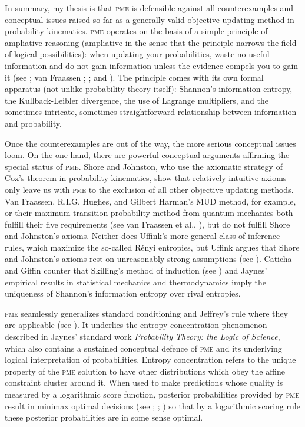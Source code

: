 \documentclass[phd,12pt,oneside]{ubcthesis}
\begin{document}
In summary, my thesis is that \textsc{pme} is defensible against all
counterexamples and conceptual issues raised so far as a generally
valid objective updating method in probability kinematics.
\textsc{pme} operates on the basis of a simple principle of ampliative
reasoning (ampliative in the sense that the principle narrows the
field of logical possibilities): when updating your probabilities,
waste no useful information and do not gain information unless the
evidence compels you to gain it (see ; van
Fraassen ; ;
and ). The principle comes with its own formal
apparatus (not unlike probability theory itself): Shannon's
information entropy, the Kullback-Leibler divergence, the use of
Lagrange multipliers, and the sometimes intricate, sometimes
straightforward relationship between information and probability.

Once the counterexamples are out of the way, the more serious
conceptual issues loom. On the one hand, there are powerful conceptual
arguments affirming the special status of \textsc{pme}. Shore and
Johnston, who use the axiomatic strategy of Cox's theorem in
probability kinematics, show that relatively intuitive axioms only
leave us with \textsc{pme} to the exclusion of all other objective
updating methods. Van Fraassen, R.I.G. Hughes, and Gilbert Harman's
MUD method, for example, or their maximum transition probability
method from quantum mechanics both fulfill their five requirements
(see van Fraassen et al., ), but do not
fulfill Shore and Johnston's axioms. Neither does Uffink's more
general class of inference rules, which maximize the so-called
R{\'e}nyi entropies, but Uffink argues that Shore and Johnston's
axioms rest on unreasonably strong assumptions (see
). Caticha and Giffin counter that Skilling's
method of induction (see ) and Jaynes'
empirical results in statistical mechanics and thermodynamics imply
the uniqueness of Shannon's information entropy over rival entropies.

\textsc{pme} seamlessly generalizes standard conditioning and
Jeffrey's rule where they are applicable (see
). It underlies the entropy concentration
phenomenon described in Jaynes' standard work \emph{Probability
  Theory: the Logic of Science}, which also contains a sustained
conceptual defence of \textsc{pme} and its underlying logical
interpretation of probabilities. Entropy concentration refers to the
unique property of the \textsc{pme} solution to have other
distributions which obey the affine constraint cluster around it. When
used to make predictions whose quality is measured by a logarithmic
score function, posterior probabilities provided by \textsc{pme}
result in minimax optimal decisions (see ;
; ) so that by a
logarithmic scoring rule these posterior probabilities are in some
sense optimal.
\end{document}
